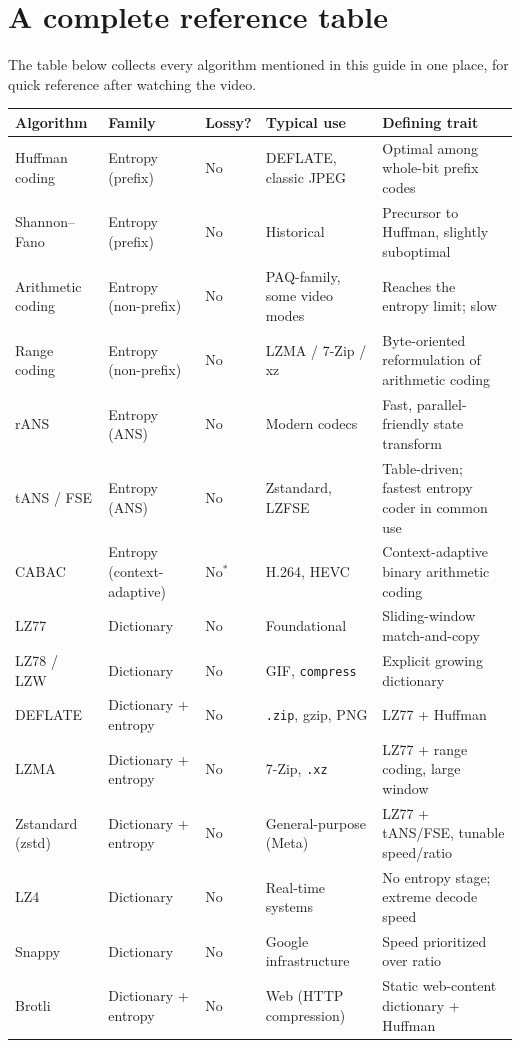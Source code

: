 \documentclass[11pt]{article}
\begin{document}
\section{A complete reference table}

The table below collects every algorithm mentioned in this guide in one place, for quick reference after watching the video.

\begin{longtable}{@{}L{3.0cm}L{2.6cm}L{1.4cm}L{4.0cm}L{4.0cm}@{}}
\toprule
\textbf{Algorithm} & \textbf{Family} & \textbf{Lossy?} & \textbf{Typical use} & \textbf{Defining trait} \\
\midrule
\endhead
Huffman coding & Entropy (prefix) & No & DEFLATE, classic JPEG & Optimal among whole-bit prefix codes \\
Shannon--Fano & Entropy (prefix) & No & Historical & Precursor to Huffman, slightly suboptimal \\
Arithmetic coding & Entropy (non-prefix) & No & PAQ-family, some video modes & Reaches the entropy limit; slow \\
Range coding & Entropy (non-prefix) & No & LZMA / 7-Zip / xz & Byte-oriented reformulation of arithmetic coding \\
rANS & Entropy (ANS) & No & Modern codecs & Fast, parallel-friendly state transform \\
tANS / FSE & Entropy (ANS) & No & Zstandard, LZFSE & Table-driven; fastest entropy coder in common use \\
CABAC & Entropy (context-adaptive) & No$^{*}$ & H.264, HEVC & Context-adaptive binary arithmetic coding \\
LZ77 & Dictionary & No & Foundational & Sliding-window match-and-copy \\
LZ78 / LZW & Dictionary & No & GIF, \texttt{compress} & Explicit growing dictionary \\
DEFLATE & Dictionary + entropy & No & \texttt{.zip}, gzip, PNG & LZ77 + Huffman \\
LZMA & Dictionary + entropy & No & 7-Zip, \texttt{.xz} & LZ77 + range coding, large window \\
Zstandard (zstd) & Dictionary + entropy & No & General-purpose (Meta) & LZ77 + tANS/FSE, tunable speed/ratio \\
LZ4 & Dictionary & No & Real-time systems & No entropy stage; extreme decode speed \\
Snappy & Dictionary & No & Google infrastructure & Speed prioritized over ratio \\
Brotli & Dictionary + entropy & No & Web (HTTP compression) & Static web-content dictionary + Huffman \\

\end{longtable}
\end{document}
